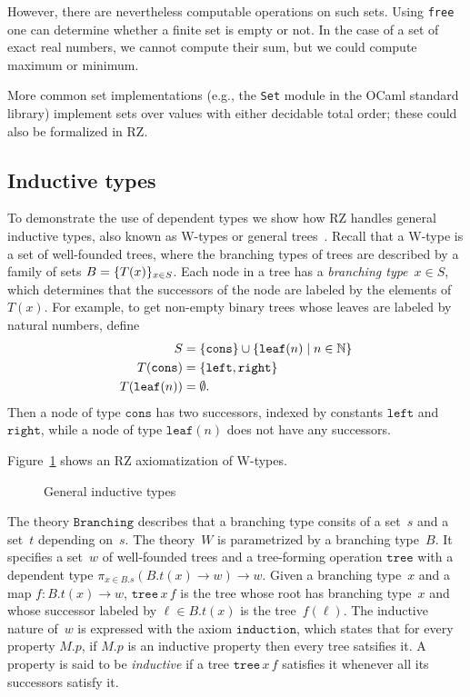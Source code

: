 However, there are nevertheless computable operations on such sets.  Using \texttt{free} one
can determine whether a finite set is empty or not.  In the case of a set of exact
real numbers, we cannot compute their sum, but we could compute maximum or minimum.

More common set implementations (e.g., the \texttt{Set} module in the OCaml standard library)
implement sets over values with either decidable total order; these could also be
formalized in RZ.

\subsection{Inductive types}
\label{sec:inductive-types}

To demonstrate the use of dependent types we show how RZ handles
general inductive types, also known as W-types or general
trees~\cite{nordstroem90:_progr_martin_type_theor}. Recall that a
W-type is a set of well-founded trees, where the branching types of
trees are described by a family of sets $B = \{T(x)\}_{x \in S}$.
Each node in a tree has a \emph{branching type}~$x \in S$, which
determines that the successors of the node are labeled by the elements
of~$T(x)$.
%
\iflong
%
For example, to get non-empty binary trees whose leaves are
labeled by natural numbers, define
%
\begin{align*}
  S &= \{\mathtt{cons}\} \cup \{\mathtt{leaf}(n) \mid n \in \mathbb{N}\}
  \\
  T(\mathtt{cons}) &= \{\mathtt{left}, \mathtt{right}\}
  \\
  T(\mathtt{leaf}(n)) &= \emptyset.
\end{align*}
%
Then a node of type $\mathtt{cons}$ has two successors, indexed by
constants $\mathtt{left}$ and $\mathtt{right}$, while a node of type
$\mathtt{leaf}(n)$ does not have any successors.
\par
%
\fi %
%
Figure~\ref{fig:wtype} shows an RZ axiomatization of W-types.
%
\begin{figure}
  \centering
  \caption{General inductive types}
  \label{fig:wtype}
\end{figure}
%
The theory $\mathtt{Branching}$ describes that a branching type
consits of a set~$s$ and a set~$t$ depending on~$s$. The theory~$W$ is
parametrized by a branching type~$B$. It specifies a set~$w$ of
well-founded trees and a tree-forming operation $\mathtt{tree}$ with a
dependent type $\pi_{x \in B.s} (B.t(x) \to w) \to w$. Given a
branching type~$x$ and a map $f : B.t(x) \to w$, $\mathtt{tree}\,x\,f$
is the tree whose root has branching type~$x$ and whose successor
labeled by $\ell \in B.t(x)$ is the tree~$f(\ell)$. The inductive
nature of~$w$ is expressed with the axiom $\mathtt{induction}$, which
states that for every property $M.p$, if $M.p$ is an inductive
property then every tree satsifies it. A property is said to be
\emph{inductive} if a tree $\mathtt{tree}\,x\,f$ satisfies it whenever
all its successors satisfy it.

